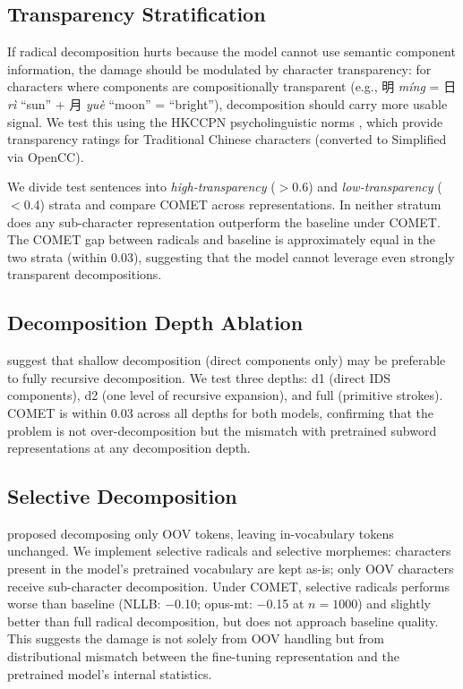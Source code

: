 \documentclass[11pt]{article}
\begin{document}
\subsection{Transparency Stratification}
\label{sec:transparency}

If radical decomposition hurts because the model cannot use semantic component information, the damage should be modulated by character transparency: for characters where components are compositionally transparent (e.g., 明 \textit{míng} = 日 \textit{rì} ``sun'' + 月 \textit{yuè} ``moon'' = ``bright''), decomposition should carry more usable signal. We test this using the HKCCPN psycholinguistic norms \citep{su-yum-lau-2022-hkccpn}, which provide transparency ratings for Traditional Chinese characters (converted to Simplified via OpenCC).

We divide test sentences into \textit{high-transparency} ($>$0.6) and \textit{low-transparency} ($<$0.4) strata and compare COMET across representations. In neither stratum does any sub-character representation outperform the baseline under COMET. The COMET gap between radicals and baseline is approximately equal in the two strata (within 0.03), suggesting that the model cannot leverage even strongly transparent decompositions.

\subsection{Decomposition Depth Ablation}

\citet{han-etal-2025-decomposition} suggest that shallow decomposition (direct components only) may be preferable to fully recursive decomposition. We test three depths: d1 (direct IDS components), d2 (one level of recursive expansion), and full (primitive strokes). COMET is within 0.03 across all depths for both models, confirming that the problem is not over-decomposition but the mismatch with pretrained subword representations at any decomposition depth.

\subsection{Selective Decomposition}

\citet{saunders-etal-2020-subchar} proposed decomposing only OOV tokens, leaving in-vocabulary tokens unchanged. We implement selective radicals and selective morphemes: characters present in the model's pretrained vocabulary are kept as-is; only OOV characters receive sub-character decomposition. Under COMET, selective radicals performs worse than baseline (NLLB: $-$0.10; opus-mt: $-$0.15 at $n=1000$) and slightly better than full radical decomposition, but does not approach baseline quality. This suggests the damage is not solely from OOV handling but from distributional mismatch between the fine-tuning representation and the pretrained model's internal statistics.
\end{document}
